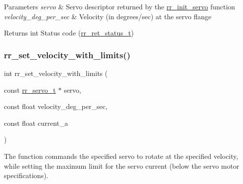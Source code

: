 \begin{DoxyParams}{Parameters}
{\em servo} & Servo descriptor returned by the \hyperlink{group___common_ga0adb313a3eeb8a4399431e940a1f3e9e}{rr\+\_\+init\+\_\+servo} function \\
\hline
{\em velocity\+\_\+deg\+\_\+per\+\_\+sec} & Velocity (in degrees/sec) at the servo flange \\
\hline
\end{DoxyParams}
\begin{DoxyReturn}{Returns}
int Status code (\hyperlink{api_8h_a92d5be5038abcf89837faf85a08debdc}{rr\+\_\+ret\+\_\+status\+\_\+t}) 
\end{DoxyReturn}
\mbox{\label{group___servo__control_ga252ba86c50217d9ccf08deaf4c75f2e7}} 
\subsubsection{\texorpdfstring{rr\+\_\+set\+\_\+velocity\+\_\+with\+\_\+limits()}{rr\_set\_velocity\_with\_limits()}}
{\footnotesize\ttfamily int rr\+\_\+set\+\_\+velocity\+\_\+with\+\_\+limits (\begin{DoxyParamCaption}\item[{const \hyperlink{structrr__servo__t}{rr\+\_\+servo\+\_\+t} $\ast$}]{servo,  }\item[{const float}]{velocity\+\_\+deg\+\_\+per\+\_\+sec,  }\item[{const float}]{current\+\_\+a }\end{DoxyParamCaption})}



The function commands the specified servo to rotate at the specified velocity, while setting the maximum limit for the servo current (below the servo motor specifications). 


